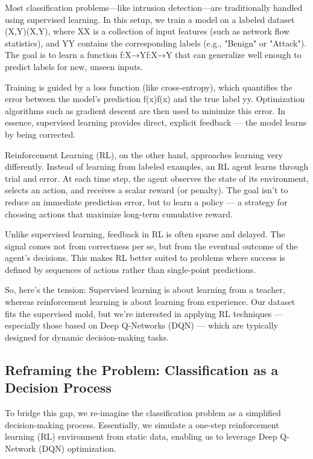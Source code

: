 \documentclass{report}
\begin{document}
Most classification problems—like intrusion detection—are traditionally handled using supervised learning. In this setup, we train a model on a labeled dataset
(X,Y)(X,Y),
where XX is a collection of input features (such as network flow statistics), and YY contains the corresponding labels (e.g., "Benign" or "Attack"). The goal is to learn a function f:X→Yf:X→Y that can generalize well enough to predict labels for new, unseen inputs.

Training is guided by a loss function (like cross-entropy), which quantifies the error between the model’s prediction f(x)f(x) and the true label yy. Optimization algorithms such as gradient descent are then used to minimize this error. In essence, supervised learning provides direct, explicit feedback — the model learns by being corrected.

Reinforcement Learning (RL), on the other hand, approaches learning very differently. Instead of learning from labeled examples, an RL agent learns through trial and error. At each time step, the agent observes the state of its environment, selects an action, and receives a scalar reward (or penalty). The goal isn’t to reduce an immediate prediction error, but to learn a policy — a strategy for choosing actions that maximize long-term cumulative reward.

Unlike supervised learning, feedback in RL is often sparse and delayed. The signal comes not from correctness per se, but from the eventual outcome of the agent's decisions. This makes RL better suited to problems where success is defined by sequences of actions rather than single-point predictions.

So, here’s the tension: Supervised learning is about learning from a teacher, whereas reinforcement learning is about learning from experience. Our dataset fits the supervised mold, but we’re interested in applying RL techniques — especially those based on Deep Q-Networks (DQN) — which are typically designed for dynamic decision-making tasks.

\subsection{Reframing the Problem: Classification as a Decision Process}

To bridge this gap, we re-imagine the classification problem as a simplified decision-making process. Essentially, we simulate a one-step reinforcement learning (RL) environment from static data, enabling us to leverage Deep Q-Network (DQN) optimization.
\end{document}
